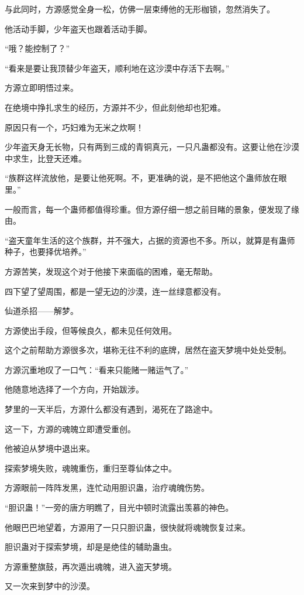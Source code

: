 \begin{this_body}
与此同时，方源感觉全身一松，仿佛一层束缚他的无形枷锁，忽然消失了。

他活动手脚，少年盗天也跟着活动手脚。

“哦？能控制了？”

“看来是要让我顶替少年盗天，顺利地在这沙漠中存活下去啊。”

方源立即明悟过来。

在绝境中挣扎求生的经历，方源并不少，但此刻他却也犯难。

原因只有一个，巧妇难为无米之炊啊！

少年盗天身无长物，只有两到三成的青铜真元，一只凡蛊都没有。这要让他在沙漠中求生，比登天还难。

“族群这样流放他，是要让他死啊。不，更准确的说，是不把他这个蛊师放在眼里。”

一般而言，每一个蛊师都值得珍重。但方源仔细一想之前目睹的景象，便发现了缘由。

“盗天童年生活的这个族群，并不强大，占据的资源也不多。所以，就算是有蛊师种子，也要择优培养。”

方源苦笑，发现这个对于他接下来面临的困难，毫无帮助。

四下望了望周围，都是一望无边的沙漠，连一丝绿意都没有。

仙道杀招——解梦。

方源使出手段，但等候良久，都未见任何效用。

这个之前帮助方源很多次，堪称无往不利的底牌，居然在盗天梦境中处处受制。

方源沉重地叹了一口气：“看来只能赌一赌运气了。”

他随意地选择了一个方向，开始跋涉。

梦里的一天半后，方源什么都没有遇到，渴死在了路途中。

这一下，方源的魂魄立即遭受重创。

他被迫从梦境中退出来。

探索梦境失败，魂魄重伤，重归至尊仙体之中。

方源眼前一阵阵发黑，连忙动用胆识蛊，治疗魂魄伤势。

“胆识蛊！”一旁的唐方明瞧了，目光中顿时流露出羡慕的神色。

他眼巴巴地望着，方源用了一只只胆识蛊，很快就将魂魄恢复过来。

胆识蛊对于探索梦境，却是是绝佳的辅助蛊虫。

方源重整旗鼓，再次遁出魂魄，进入盗天梦境。

又一次来到梦中的沙漠。


\end{this_body}
